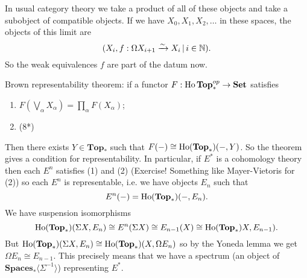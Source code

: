 \documentclass[class=report, crop=false,a4paper,twoside]{standalone}
\begin{document}
\begin{example}
	In usual category theory we take a product of all of these objects and take a subobject of compatible objects. If we have $X_0,X_1,X_2,\dots$ in these spaces, the objects of this limit are
	\[
	(X_i, f: \Omega X_{i+1} \xrightarrow{\sim} X_i \,|\, i \in \mathbb{N}). 
	\]
	So the weak equivalences $f$ are part of the datum now.

	Brown representability theorem: if a functor $F: \operatorname{Ho}\mathbf{Top}_*^{op} \to \mathbf{Set}$ satisfies
	\begin{enumerate}
		\item $F(\bigvee_\alpha X_\alpha) = \prod_\alpha F(X_\alpha)$;
		\item (8*)
	\end{enumerate}
	Then there exists $Y \in \mathbf{Top}_*$ such that $F(-) \cong \operatorname{Ho}(\mathbf{Top}_*)(-,Y)$. So the theorem gives a condition for representability. In particular, if $E^*$ is a cohomology theory then each $E^n$ satisfies (1) and (2) (Exercise! Something like Mayer-Vietoris for (2)) so each $E^n$ is representable, i.e. we have objects $E_n$ such that
	\[
	E^n(-) = \operatorname{Ho}(\mathbf{Top}_*)(-,E_n). 
	\]
	We have suspension isomorphisms
	\[
	\operatorname{Ho}(\mathbf{Top}_*)(\Sigma X,E_n) \cong E^n(\Sigma X) \cong E_{n-1}(X) \cong \operatorname{Ho}(\mathbf{Top}_*)X,E_{n-1}). 
	\]
	But $\operatorname{Ho}(\mathbf{Top}_*)(\Sigma X,E_n) \cong \operatorname{Ho}(\mathbf{Top}_*)(X,\Omega E_n)$ so by the Yoneda lemma we get $\Omega E_n \cong E_{n-1}$. This precisely means that we have a spectrum (an object of $\mathbf{Spaces}_*\langle \Sigma^{-1} \rangle$) representing $E^*$.
\end{example}

% 
\end{document}
